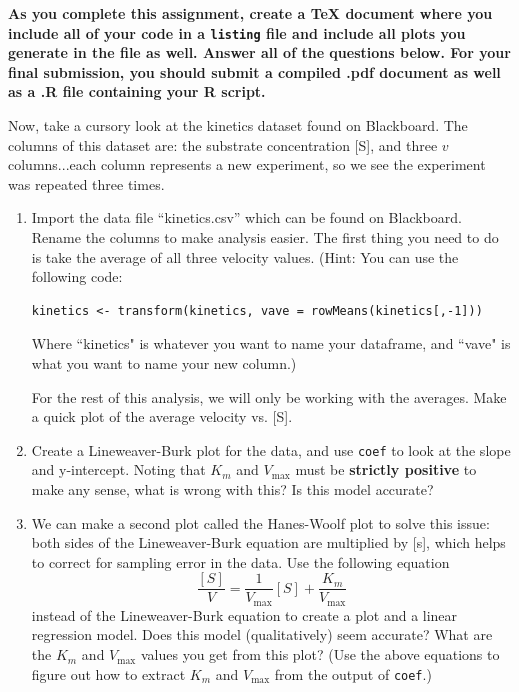 \documentclass[11pt]{article}
\begin{document}
{\bf As you complete this assignment, create a TeX document where you include all of your code in a \texttt{listing} file and include all plots you generate in the file as well. Answer all of the questions below. For your final submission, you should submit a compiled .pdf document as well as a .R file containing your R script.}

Now, take a cursory look at the kinetics dataset found on Blackboard. The columns of this dataset are: the substrate concentration [S], and three \(v\) columns...each column represents a new experiment, so we see the experiment was repeated three times.

\begin{enumerate}

\item Import the data file ``kinetics.csv'' which can be found on Blackboard. Rename the columns to make analysis easier. The first thing you need to do is take the average of all three velocity values. (Hint: You can use the following code:
\begin{center}
\begin{verbatim}
kinetics <- transform(kinetics, vave = rowMeans(kinetics[,-1]))
\end{verbatim}
\end{center}

Where ``kinetics" is whatever you want to name your dataframe, and ``vave" is what you want to name your new column.)

For the rest of this analysis, we will only be working with the averages. Make a quick plot of the average velocity vs. [S].

\item Create a Lineweaver-Burk plot for the data, and use \texttt{coef} to look at the slope and y-intercept. Noting that \(K_m\) and \(V_{\mathrm{max}}\) must be {\bf strictly positive} to make any sense, what is wrong with this? Is this model accurate?

\item We can make a second plot called the Hanes-Woolf plot to solve this issue: both sides of the Lineweaver-Burk equation are multiplied by [s], which helps to correct for sampling error in the data. Use the following equation
\[
\frac{[S]}{V} = \frac{1}{V_{\mathrm{max}}}[S] + \frac{K_m}{V_{\mathrm{max}}}
\]
instead of the Lineweaver-Burk equation to create a plot and a linear regression model. Does this model (qualitatively) seem accurate? What are the \(K_m\) and \(V_{\mathrm{max}}\) values you get from this plot? (Use the above equations to figure out how to extract \(K_m\) and \(V_{\mathrm{max}}\) from the output of \texttt{coef}.)


\end{enumerate}
\end{document}
